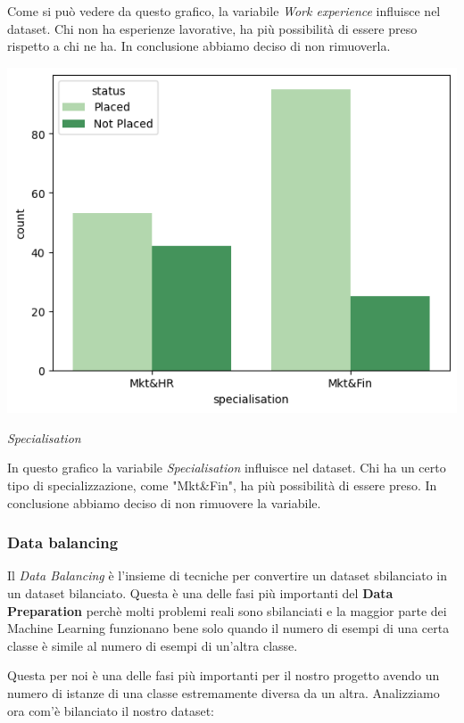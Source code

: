 \documentclass[12pt]{article}
\begin{document}
Come si può vedere da questo grafico, la variabile \textit{Work experience} influisce nel dataset. Chi non ha esperienze lavorative, ha più possibilità di essere preso rispetto a chi ne ha.
In conclusione abbiamo deciso di non rimuoverla.
\begin{center}
    \includegraphics[scale=0.5]{specialisation.png}

    \textit{Specialisation}
\end{center}
In questo grafico la variabile \textit{Specialisation} influisce nel dataset. Chi ha un certo tipo di specializzazione, come "Mkt\&Fin", ha più possibilità di essere preso.
In conclusione abbiamo deciso di non rimuovere la variabile.

\subsubsection{Data balancing}
Il \textit{Data Balancing} è l'insieme di tecniche per convertire un dataset sbilanciato in un dataset bilanciato.
Questa è una delle fasi più importanti del \textbf{Data Preparation} perchè molti problemi reali sono sbilanciati e
la maggior parte dei Machine Learning funzionano bene solo quando il numero di esempi di una certa classe è simile al numero di esempi di un'altra classe.
\par
Questa per noi è una delle fasi più importanti per il nostro progetto avendo un numero di istanze di una classe estremamente diversa da un altra.
Analizziamo ora com'è bilanciato il nostro dataset:
\end{document}
